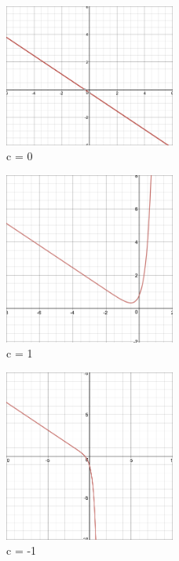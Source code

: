 \documentclass[11pt]{article}
\theoremstyle{definition}
\begin{document}
\begin{figure}[h!]
    \begin{center}
        \includegraphics[width=0.5\textwidth]{c0.png}
        \caption{c = 0}
    \end{center}
\end{figure}
\begin{figure}[h!]
    \begin{center}
        \includegraphics[width=0.5\textwidth]{c1.png}
        \caption{c = 1}
    \end{center}
\end{figure}

\begin{figure}[h!]
    \begin{center}
        \includegraphics[width=0.5\textwidth]{c-1.png}
        \caption{c = -1}
    \end{center}
\end{figure}
\vspace{5000mm}
\clearpage
\newpage
\end{document}

